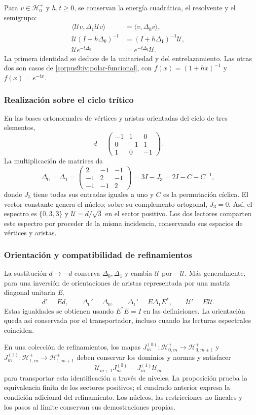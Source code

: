 Para \(v\in\mathcal H_0^+\) y \(h,t\geq0\), se conservan
la energía cuadrática, el resolvente y el semigrupo:
\begin{align}
 \langle\mathcal Uv,\Delta_1\mathcal Uv\rangle
    &=\langle v,\Delta_0v\rangle,\\
 \mathcal U(I+h\Delta_0)^{-1}
    &=(I+h\Delta_1)^{-1}\mathcal U,\\
 \mathcal Ue^{-t\Delta_0}
    &=e^{-t\Delta_1}\mathcal U.
 \label{corpus9:iv:polar-lectores}
\end{align}
La primera identidad se deduce de la unitariedad y del
entrelazamiento. Las otras dos son casos de
\eqref{corpus9:iv:polar-funcional}, con
\(f(x)=(1+hx)^{-1}\) y \(f(x)=e^{-tx}\).

\subsubsection{Realización sobre el ciclo trítico}
En las bases ortonormales de vértices y aristas orientadas
del ciclo de tres elementos,
\[
 d=
 \begin{pmatrix}
 -1&1&0\\
 0&-1&1\\
 1&0&-1
 \end{pmatrix}.
\]
La multiplicación de matrices da
\[
 \Delta_0=\Delta_1=
 \begin{pmatrix}
 2&-1&-1\\
 -1&2&-1\\
 -1&-1&2
 \end{pmatrix}
 =3I-J_3=2I-C-C^{-1},
\]
donde \(J_3\) tiene todas sus entradas iguales a uno y \(C\)
es la permutación cíclica. El vector constante genera el
núcleo; sobre su complemento ortogonal, \(J_3=0\).
Así, el espectro es \(\{0,3,3\}\) y
\(\mathcal U=d/\sqrt3\) en el sector positivo.
Los dos lectores comparten este espectro por proceder de la
misma incidencia, conservando sus espacios de vértices y
aristas.

\subsubsection{Orientación y compatibilidad de refinamientos}
La sustitución \(d\mapsto-d\) conserva \(\Delta_0,\Delta_1\)
y cambia \(\mathcal U\) por \(-\mathcal U\). Más
generalmente, para una inversión de orientaciones de aristas
representada por una matriz diagonal unitaria \(E\),
\[
 d'=Ed,\qquad \Delta_0'=\Delta_0,\qquad
 \Delta_1'=E\Delta_1E^*,\qquad \mathcal U'=E\mathcal U.
\]
Estas igualdades se obtienen usando \(E^*E=I\) en las
definiciones. La orientación queda así conservada por el
transportador, incluso cuando las lecturas espectrales
coinciden.

En una colección de refinamientos, los mapas
\(J_m^{(0)}:\mathcal H_{0,m}^+\to\mathcal H_{0,m+1}^+\)
y
\(J_m^{(1)}:\mathcal H_{1,m}^+\to\mathcal H_{1,m+1}^+\)
deben conservar los dominios y normas y satisfacer
\[
 \mathcal U_{m+1}J_m^{(0)}
    =J_m^{(1)}\mathcal U_m
\]
para transportar esta identificación a través de niveles.
La proposición prueba la equivalencia finita de los sectores
positivos; el cuadrado anterior expresa la condición adicional
del refinamiento. Los núcleos, las restricciones no lineales
y los pasos al límite conservan sus demostraciones propias.
